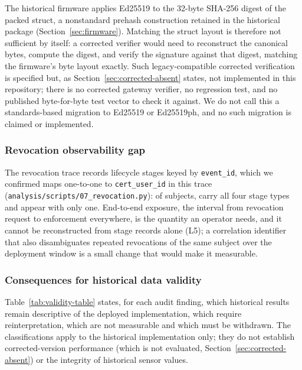 The historical firmware applies Ed25519 to the 32-byte SHA-256 digest of the packed struct, a nonstandard prehash construction retained in the historical package (Section~\ref{sec:firmware}). Matching the struct layout is therefore not sufficient by itself: a corrected verifier would need to reconstruct the canonical bytes, compute the digest, and verify the signature against that digest, matching the firmware's byte layout exactly. Such legacy-compatible corrected verification is specified but, as Section~\ref{sec:corrected-absent} states, not implemented in this repository; there is no corrected gateway verifier, no regression test, and no published byte-for-byte test vector to check it against. We do not call this a standards-based migration to Ed25519 or Ed25519ph, and no such migration is claimed or implemented.

\subsubsection{Revocation observability gap}
\label{sec:revocation-audit}

The revocation trace records lifecycle stages keyed by \texttt{event\_id}, which we confirmed maps one-to-one to \texttt{cert\_user\_id} in this trace (\texttt{analysis/scripts/07\_revocation.py}): of \RevocationSubjects{} subjects, \RevocationSubjectsAllStages{} carry all four stage types and \RevocationSubjectsOnce{} appear with only one. End-to-end exposure, the interval from revocation request to enforcement everywhere, is the quantity an operator needs, and it cannot be reconstructed from stage records alone (L5); a correlation identifier that also disambiguates repeated revocations of the same subject over the deployment window is a small change that would make it measurable.

\subsubsection{Consequences for historical data validity}

Table~\ref{tab:validity-table} states, for each audit finding, which historical results remain descriptive of the deployed implementation, which require reinterpretation, which are not measurable and which must be withdrawn. The classifications apply to the historical implementation only; they do not establish corrected-version performance (which is not evaluated, Section~\ref{sec:corrected-absent}) or the integrity of historical sensor values.


